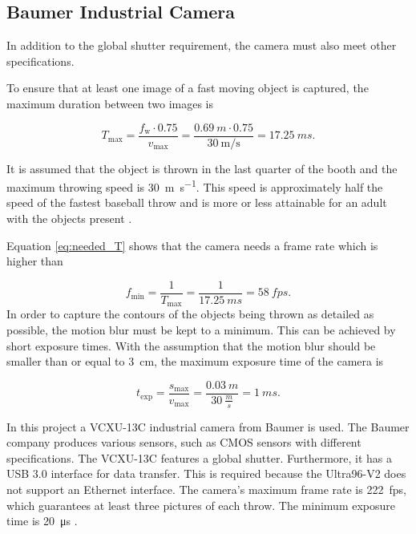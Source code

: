 \subsection{Baumer Industrial Camera}
\label{subsec:baumer_cam}

In addition to the global shutter requirement, the camera must also meet other specifications.

To ensure that at least one image of a fast moving object is captured, the maximum duration between two images is

\begin{equation}
  T_\text{max} = \frac{f_\text{w} \cdot 0.75}{v_\text{max}} = \frac{\SI{0.69}{m} \cdot 0.75}{\SI[fraction=sfrac]{30}{\metre\per\second}} = \SI{17.25}{ms}.
  \label{eq:needed_T}
\end{equation}

It is assumed that the object is thrown in the last quarter of the booth and the maximum throwing speed is \SI[fraction=sfrac]{30}{\metre\per\second}.
This speed is approximately half the speed of the fastest baseball throw and is more or less attainable for an adult with the objects present \cite{speed_baseball}.

Equation \ref{eq:needed_T} shows that the camera needs a frame rate which is higher than

\begin{equation}
  f_\text{min} = \frac{1}{T_\text{max}} = \frac{1}{\SI{17.25}{ms}} = \SI{58}{fps}.
  \label{eq:needed_fps}
\end{equation}
\clearpage
In order to capture the contours of the objects being thrown as detailed as possible, the motion blur must be kept to a minimum. 
This can be achieved by short exposure times. 
With the assumption that the motion blur should be smaller than or equal to \SI{3}{cm}, the maximum exposure time of the camera is

\begin{equation}
  t_\text{exp} = \frac{s_\text{max}}{v_\text{max}} = \frac{\SI{0.03}{m}}{\SI{30}{\frac{m}{s}}} = \SI{1}{ms}.
  \label{eq:texp}
\end{equation}

In this project a VCXU-13C industrial camera from Baumer is used.
The Baumer company produces various sensors, such as CMOS sensors with different specifications.
The VCXU-13C features a global shutter.
Furthermore, it has a USB 3.0 interface for data transfer.
This is required because the Ultra96-V2 does not support an Ethernet interface.
The camera's maximum frame rate is \SI{222}{fps}, which guarantees at least three pictures of each throw.
The minimum exposure time is \SI{20}{\micro s} \cite{baumer_cam}.

